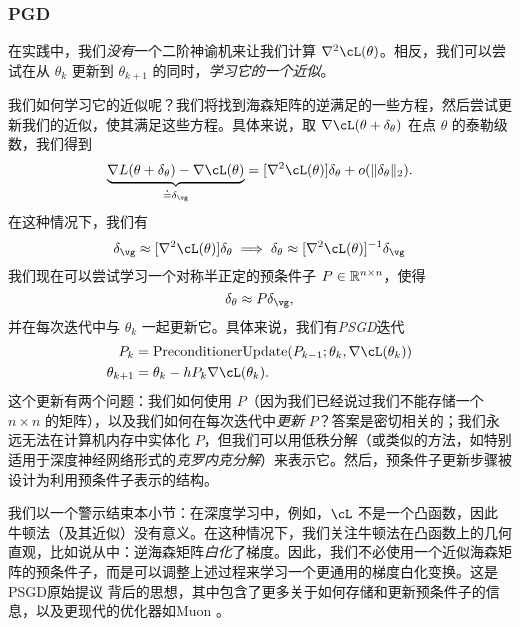 \documentclass[../../book-main_zh.tex]{subfiles}
\begin{document}
\subsubsection{PGD}

在实践中，我们\textit{没有}一个二阶神谕机来让我们计算 \(\nabla^{2}\cL(\theta)\)。相反，我们可以尝试在从 \(\theta_{k}\) 更新到 \(\theta_{k + 1}\) 的同时，\textit{学习它的一个近似}。

我们如何学习它的近似呢？我们将找到海森矩阵的逆满足的一些方程，然后尝试更新我们的近似，使其满足这些方程。具体来说，取 \(\nabla \cL(\theta + \delta_{\theta})\) 在点 \(\theta\) 的泰勒级数，我们得到
\begin{equation}
    \underbrace{\nabla L(\theta + \delta_{\theta}) - \nabla \cL(\theta)}_{\doteq \delta_{\vg}} = [\nabla^{2} \cL(\theta)]\delta_{\theta} + o(\norm{\delta_{\theta}}_{2}).
\end{equation}
在这种情况下，我们有
\begin{equation}
    \delta_{\vg} \approx [\nabla^{2}\cL(\theta)]\delta_{\theta} \implies \delta_{\theta} \approx [\nabla^{2}\cL(\theta)]^{-1}\delta_{\vg}
\end{equation}
我们现在可以尝试学习一个对称半正定的预条件子 \(P \in \mathbb{R}^{n \times n}\)，使得
\begin{equation}
    \delta_{\theta} \approx P\delta_{\vg},
\end{equation}
并在每次迭代中与 \(\theta_{k}\) 一起更新它。具体来说，我们有\textit{PSGD}迭代
\begin{align}
    P_{k}
    &= \mathrm{PreconditionerUpdate}(P_{k - 1}; \theta_{k}, \nabla \cL(\theta_{k})) \\ 
    \theta_{k + 1}
    &= \theta_{k} - hP_{k}\nabla \cL(\theta_{k}).
\end{align}
这个更新有两个问题：我们如何使用 \(P\)（因为我们已经说过我们不能存储一个 \(n \times n\) 的矩阵），以及我们如何在每次迭代中\textit{更新} \(P\)？答案是密切相关的；我们永远无法在计算机内存中实体化 \(P\)，但我们可以用低秩分解（或类似的方法，如特别适用于深度神经网络形式的\textit{克罗内克分解}）来表示它。然后，预条件子更新步骤被设计为利用预条件子表示的结构。

我们以一个警示结束本小节：在深度学习中，例如，\(\cL\) 不是一个凸函数，因此牛顿法（及其近似）没有意义。在这种情况下，我们关注牛顿法在凸函数上的几何直观，比如说从中：逆海森矩阵\textit{白化}了梯度。因此，我们不必使用一个近似海森矩阵的预条件子，而是可以调整上述过程来学习一个更通用的梯度白化变换。这是PSGD原始提议 \cite{li2017preconditioned} 背后的思想，其中包含了更多关于如何存储和更新预条件子的信息，以及更现代的优化器如Muon \cite{liu2025muon}。
\end{document}
